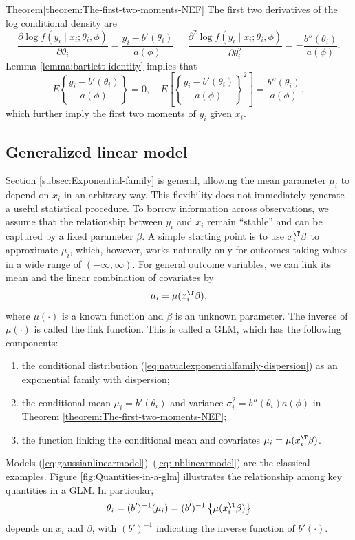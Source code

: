 \begin{myproof}{Theorem}{\ref{theorem:The-first-two-moments-NEF}}
The first two derivatives of the log conditional density are
\[
\frac{\partial\log f(y_{i}\mid x_{i};\theta_{i},\phi)}{\partial\theta_{i}}=\frac{y_{i}-b'(\theta_{i})}{a(\phi)},\quad\frac{\partial^{2}\log f(y_{i}\mid x_{i};\theta_{i},\phi)}{\partial\theta_{i}^{2}}=-\frac{b''(\theta_{i})}{a(\phi)}.
\]
Lemma \ref{lemma:bartlett-identity} implies that
\[
E\left\{ \frac{y_{i}-b'(\theta_{i})}{a(\phi)}\right\} =0,\quad E\left[\left\{ \frac{y_{i}-b'(\theta_{i})}{a(\phi)}\right\} ^{2}\right]=\frac{b''(\theta_{i})}{a(\phi)},
\]
which further imply the first two moments of $y_{i}$ given $x_i$. 
\end{myproof}


\subsection{Generalized linear model}

Section \ref{subsec:Exponential-family} is general, allowing the
mean parameter $\mu_{i}$ to depend on $x_{i}$ in an arbitrary way.
This flexibility does not immediately generate a useful statistical
procedure. To borrow information across observations, we assume that
the relationship between $y_{i}$ and $x_{i}$ remain ``stable'' and
can be captured by a fixed parameter $\beta$. A simple starting point
is to use $x_{i}^{\T}\beta$ to approximate $\mu_{i}$, which, however,
works naturally only for outcomes taking values in a wide range of $(-\infty, \infty)$. For general outcome variables,
we can link its mean and the linear combination of covariates by
\[
\mu_{i}=\mu(x_{i}^{\T}\beta),
\]
where $\mu(\cdot)$ is a known function and $\beta$ is an unknown
parameter. The inverse of $\mu(\cdot)$ is called the link function. This is called a GLM, which
has the following components:
\begin{enumerate}
[(C1)]
\item the conditional distribution (\ref{eq:natualexponentialfamily-dispersion})
as an exponential family with dispersion;
\item the conditional mean $\mu_{i}=b'(\theta_{i})$ and variance $\sigma_{i}^{2}=b''(\theta_{i})a(\phi)$
in Theorem \ref{theorem:The-first-two-moments-NEF};
\item the function linking the conditional mean and covariates $\mu_{i}=\mu(x_{i}^{\T}\beta)$. 
\end{enumerate}
Models (\ref{eq:gaussianlinearmodel})--(\ref{eq: nblinearmodel})
are the classical examples. 
Figure \ref{fig:Quantities-in-a-glm} illustrates the relationship among key quantities in a GLM.  In particular,
\begin{equation}
\theta_{i}=(b')^{-1}(\mu_{i})=(b')^{-1}\left\{ \mu(x_{i}^{\T}\beta)\right\} \label{eq:theta-beta-link}
\end{equation}
depends on $x_i$ and $\beta$, with $(b')^{-1}$ indicating the inverse function of $b'(\cdot)$. 



